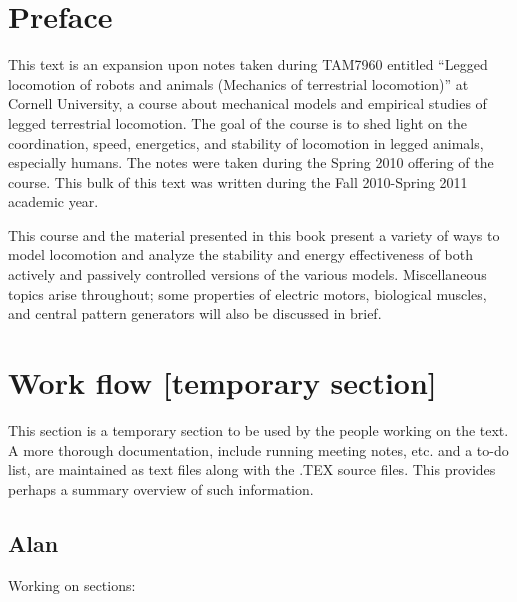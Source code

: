 \chapter*{Preface}

This text is an expansion upon notes taken during TAM7960 entitled ``Legged locomotion of robots and animals
(Mechanics of terrestrial locomotion)'' at Cornell University, a course about mechanical models and empirical studies of legged terrestrial locomotion. The goal of the course is to shed light on the coordination, speed, energetics, and stability of locomotion in legged animals, especially humans. The notes were taken during the Spring 2010 offering of the course. This bulk of this text was written during the Fall 2010-Spring 2011 academic year.

This course and the material presented in this book present a variety of ways to model locomotion and analyze the stability and energy effectiveness of both actively and passively controlled versions of the various models. Miscellaneous topics arise throughout; some properties of electric motors, biological muscles, and central pattern generators will also be discussed in brief.

\chapter*{Work flow [temporary section]}

This section is a temporary section  to be used by the people working on the text. A more thorough documentation, include running meeting notes, etc. and a to-do list, are maintained as text files along with the .TEX source files. This provides perhaps a summary overview of such information.

\section*{Alan}

Working on sections:

